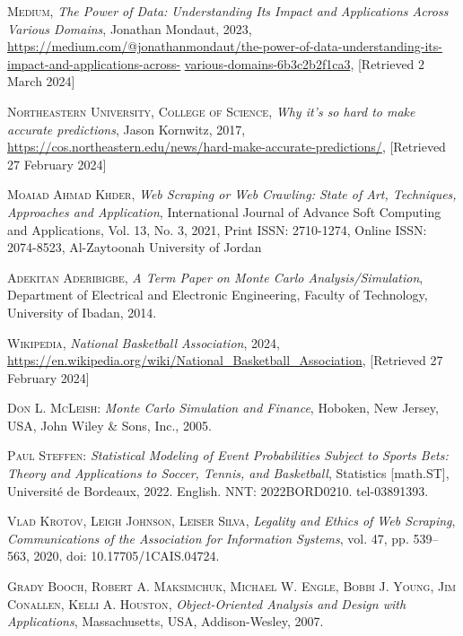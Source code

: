 \documentclass{thesis-ekf}
\theoremstyle{definition}
\theoremstyle{remark}
\begin{document}
\begin{thebibliography}{2}

\textsc{Medium}, 
\emph {The Power of Data: Understanding Its Impact and Applications Across Various Domains}, Jonathan Mondaut, 2023, \url{https://medium.com/@jonathanmondaut/the-power-of-data-understanding-its-impact-and-applications-across-}
\url{various-domains-6b3c2b2f1ca3}, [Retrieved 2 March 2024]

\textsc{Northeastern University, College of Science},
\emph{Why it’s so hard to make accurate predictions}, Jason Kornwitz, 2017, \url{https://cos.northeastern.edu/news/hard-make-accurate-predictions/}, [Retrieved 27 February 2024]

\textsc{Moaiad Ahmad Khder},
\emph{Web Scraping or Web Crawling: State of Art, Techniques, Approaches and Application}, 
International Journal of Advance Soft Computing and Applications, 
Vol. 13, No. 3, 2021, 
Print ISSN: 2710-1274, Online ISSN: 2074-8523, 
Al-Zaytoonah University of Jordan

\textsc{Adekitan Aderibigbe},
\emph{A Term Paper on Monte Carlo Analysis/Simulation},
Department of Electrical and Electronic Engineering,
Faculty of Technology, University of Ibadan,
2014.

\textsc{Wikipedia},
\emph{National Basketball Association}, 2024, 
\url{https://en.wikipedia.org/wiki/National_Basketball_Association}, [Retrieved 27 February 2024]

\textsc{Don L. McLeish}: 
\emph{Monte Carlo Simulation and Finance}, 
Hoboken, New Jersey, USA, John Wiley \& Sons, Inc., 2005.

\textsc{Paul Steffen}:
\emph{Statistical Modeling of Event Probabilities Subject to Sports Bets: Theory and Applications to Soccer, Tennis, and Basketball},
Statistics [math.ST], Université de Bordeaux, 2022.
English.
NNT: 2022BORD0210.
tel-03891393.

\textsc{Vlad Krotov, Leigh Johnson, Leiser Silva},
\emph{Legality and Ethics of Web Scraping},
\textit{Communications of the Association for Information Systems},
vol. 47,
pp. 539--563,
2020,
doi: 10.17705/1CAIS.04724.




\textsc{Grady Booch, Robert A. Maksimchuk, Michael W. Engle, Bobbi J. Young, Jim Conallen, Kelli A. Houston},
\emph{Object-Oriented Analysis and Design with Applications}, 
Massachusetts, USA, Addison-Wesley, 2007.


\end{thebibliography}
\end{document}
